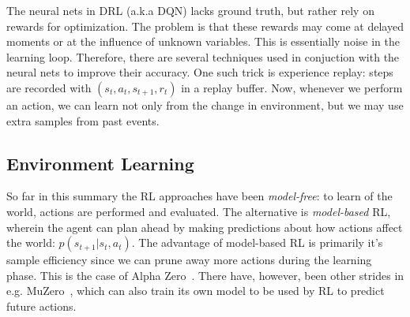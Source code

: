 \documentclass[10pt,twocolumn,letterpaper]{article}
\begin{document}
The neural nets in \gls{DRL} (a.k.a \gls{DQN}) lacks ground truth, but rather rely on rewards for optimization. The problem is that these rewards may come at delayed moments or at the influence of unknown variables. This is essentially noise in the learning loop. Therefore, there are several techniques used in conjuction with the neural nets to improve their accuracy. One such trick is experience replay: steps are recorded with $(s_{t}, a_{t}, s_{t+1}, r_{t})$ in a replay buffer. Now, whenever we perform an action, we can learn not only from the change in environment, but we may use extra samples from past events.


\subsection{Environment Learning}
So far in this summary the \gls{RL} approaches have been \textit{model-free}: to learn of the world, actions are performed and evaluated. The alternative is \textit{model-based} \gls{RL}, wherein the agent can plan ahead by making predictions about how actions affect the world: $p(s_{t+1} \vert{} s_{t}, a_{t})$. The advantage of model-based \gls{RL} is primarily it's sample efficiency since we can prune away more actions during the learning phase. This is the case of Alpha Zero~\cite{alphaZero}. There have, however, been other strides in e.g. MuZero~\cite{muZero}, which can also train its own model to be used by \gls{RL} to predict future actions.






\end{document}
